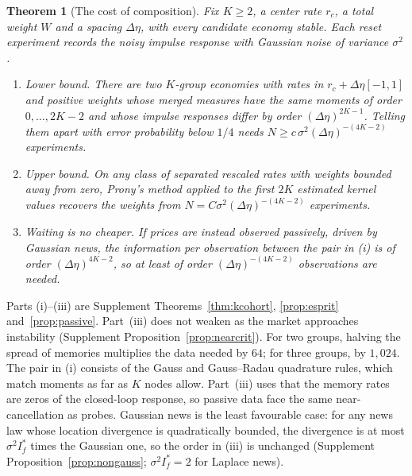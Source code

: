 \documentclass[12pt]{article}
\newtheorem{theorem}{Theorem}[section]
\theoremstyle{definition}
\theoremstyle{remark}
\begin{document}
\begin{theorem}[The cost of composition]\label{n:cost}
Fix $K\ge2$, a center rate $r_c$, a total weight $W$ and a spacing $\Delta\eta$, with every candidate economy stable. Each reset experiment records the noisy impulse response with Gaussian noise of variance $\sigma^2$.
\begin{enumerate}[label=(\roman*),itemsep=1pt]
\item \emph{Lower bound.} There are two $K$-group economies with rates in $r_c+\Delta\eta[-1,1]$ and positive weights whose merged measures have the same moments of order $0,\ldots,2K-2$ and whose impulse responses differ by order $(\Delta\eta)^{2K-1}$. Telling them apart with error probability below $1/4$ needs $N\ge c\,\sigma^2(\Delta\eta)^{-(4K-2)}$ experiments.
\item \emph{Upper bound.} On any class of separated rescaled rates with weights bounded away from zero, Prony's method applied to the first $2K$ estimated kernel values recovers the weights from $N=C\sigma^2(\Delta\eta)^{-(4K-2)}$ experiments.
\item \emph{Waiting is no cheaper.} If prices are instead observed passively, driven by Gaussian news, the information per observation between the pair in (i) is of order $(\Delta\eta)^{4K-2}$, so at least of order $(\Delta\eta)^{-(4K-2)}$ observations are needed.
\end{enumerate}
\end{theorem}

Parts (i)--(iii) are Supplement Theorems~\ref{thm:kcohort}, \ref{prop:esprit} and~\ref{prop:passive}. Part~(iii) does not weaken as the market approaches instability (Supplement Proposition~\ref{prop:nearcrit}). For two groups, halving the spread of memories multiplies the data needed by $64$; for three groups, by $1{,}024$. The pair in (i) consists of the Gauss and Gauss--Radau quadrature rules, which match moments as far as $K$ nodes allow. Part~(iii) uses that the memory rates are zeros of the closed-loop response, so passive data face the same near-cancellation as probes. Gaussian news is the least favourable case: for any news law whose location divergence is quadratically bounded, the divergence is at most $\sigma^2I^*_f$ times the Gaussian one, so the order in (iii) is unchanged (Supplement Proposition~\ref{prop:nongauss}; $\sigma^2I^*_f=2$ for Laplace news).
\end{document}
